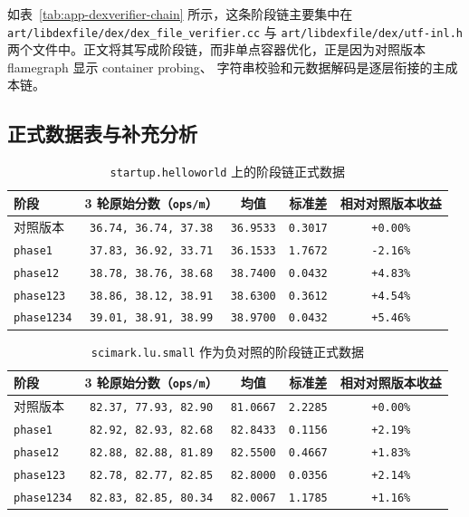 如表~\ref{tab:app-dexverifier-chain} 所示，这条阶段链主要集中在
\texttt{art/libdexfile/dex/dex\_file\_verifier.cc} 与 \texttt{art/libdexfile/dex/utf-inl.h}
两个文件中。正文将其写成阶段链，而非单点容器优化，正是因为对照版本 flamegraph 显示 container probing、
字符串校验和元数据解码是逐层衔接的主成本链。

\subsection{正式数据表与补充分析}

\begin{table}[htbp]
    \centering
    \scriptsize
    \caption{\texttt{startup.helloworld} 上的阶段链正式数据}
    \label{tab:app-dexverifier-startup}
    \begin{tabular}{lcccc}
        \hline
        \textbf{阶段} & \textbf{3 轮原始分数（\texttt{ops/m}）} & \textbf{均值} & \textbf{标准差} & \textbf{相对对照版本收益} \\
        \hline
        对照版本 & \texttt{36.74, 36.74, 37.38} & \texttt{36.9533} & \texttt{0.3017} & \texttt{+0.00\%} \\
        \texttt{phase1} & \texttt{37.83, 36.92, 33.71} & \texttt{36.1533} & \texttt{1.7672} & \texttt{-2.16\%} \\
        \texttt{phase12} & \texttt{38.78, 38.76, 38.68} & \texttt{38.7400} & \texttt{0.0432} & \texttt{+4.83\%} \\
        \texttt{phase123} & \texttt{38.86, 38.12, 38.91} & \texttt{38.6300} & \texttt{0.3612} & \texttt{+4.54\%} \\
        \texttt{phase1234} & \texttt{39.01, 38.91, 38.99} & \texttt{38.9700} & \texttt{0.0432} & \texttt{+5.46\%} \\
        \hline
    \end{tabular}
\end{table}

\begin{table}[htbp]
    \centering
    \scriptsize
    \caption{\texttt{scimark.lu.small} 作为负对照的阶段链正式数据}
    \label{tab:app-dexverifier-lu}
    \begin{tabular}{lcccc}
        \hline
        \textbf{阶段} & \textbf{3 轮原始分数（\texttt{ops/m}）} & \textbf{均值} & \textbf{标准差} & \textbf{相对对照版本收益} \\
        \hline
        对照版本 & \texttt{82.37, 77.93, 82.90} & \texttt{81.0667} & \texttt{2.2285} & \texttt{+0.00\%} \\
        \texttt{phase1} & \texttt{82.92, 82.93, 82.68} & \texttt{82.8433} & \texttt{0.1156} & \texttt{+2.19\%} \\
        \texttt{phase12} & \texttt{82.88, 82.88, 81.89} & \texttt{82.5500} & \texttt{0.4667} & \texttt{+1.83\%} \\
        \texttt{phase123} & \texttt{82.78, 82.77, 82.85} & \texttt{82.8000} & \texttt{0.0356} & \texttt{+2.14\%} \\
        \texttt{phase1234} & \texttt{82.83, 82.85, 80.34} & \texttt{82.0067} & \texttt{1.1785} & \texttt{+1.16\%} \\
        \hline
    \end{tabular}
\end{table}

